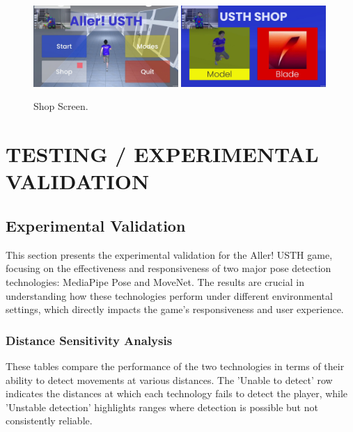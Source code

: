 \documentclass[12pt]{article}
\begin{document}
\begin{figure}[h]
    \centering
    \includegraphics[width=0.49\textwidth]{game9.jpg}
    \includegraphics[width=0.49\textwidth]{game10.jpg}
    \caption{Shop Screen.}
\end{figure}


\clearpage

\section{TESTING / EXPERIMENTAL VALIDATION}
\subsection{Experimental Validation}

This section presents the experimental validation for the Aller! USTH game, focusing on the effectiveness and responsiveness of two major pose detection technologies: MediaPipe Pose and MoveNet. The results are crucial in understanding how these technologies perform under different environmental settings, which directly impacts the game's responsiveness and user experience.

\subsubsection{Distance Sensitivity Analysis}

These tables compare the performance of the two technologies in terms of their ability to detect movements at various distances. The 'Unable to detect' row indicates the distances at which each technology fails to detect the player, while 'Unstable detection' highlights ranges where detection is possible but not consistently reliable.
\end{document}
